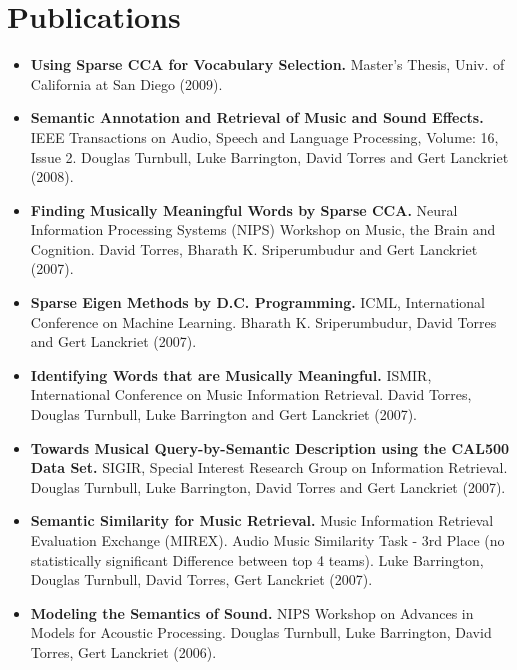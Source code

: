 \documentclass[letterpaper,11pt]{article}
\newcommand{\publicationItem}[2]{
    \item\small{
      \textbf{#1}{ #2 \vspace{-2pt}}
    }
  }
\newcommand{\resumeItemListStart}{\begin{itemize}}
\newcommand{\resumeItemListEnd}{\end{itemize}\vspace{-5pt}}
\begin{document}
\section{Publications}

    \resumeItemListStart
  
    \publicationItem{Using Sparse CCA for Vocabulary Selection.}
        {Master's Thesis, Univ. of California at San Diego (2009).}
    
    \publicationItem{Semantic Annotation and Retrieval of Music and Sound Effects.}
        {IEEE Transactions on Audio, Speech and Language Processing, Volume: 16, Issue 2.
    Douglas Turnbull, Luke Barrington, David Torres and Gert Lanckriet (2008).}

    \publicationItem{Finding Musically Meaningful Words by Sparse CCA.}
        {Neural Information Processing Systems (NIPS) Workshop on Music, the Brain and Cognition. David Torres, Bharath K.
    Sriperumbudur and Gert Lanckriet (2007).}

    \publicationItem{Sparse Eigen Methods by D.C. Programming.}
        {ICML, International Conference on Machine Learning. Bharath K. Sriperumbudur, David Torres and Gert Lanckriet (2007).}

    \publicationItem{Identifying Words that are Musically Meaningful.}
        {ISMIR, International Conference on Music Information Retrieval. David Torres, Douglas Turnbull, Luke Barrington and Gert
    Lanckriet (2007).}

    \publicationItem{Towards Musical Query-by-Semantic Description using the CAL500 Data Set.}
        {SIGIR, Special Interest Research Group on Information Retrieval. Douglas Turnbull, Luke
    Barrington, David Torres and Gert Lanckriet (2007).}

    \publicationItem{Semantic Similarity for Music Retrieval.}
        {Music Information Retrieval Evaluation Exchange (MIREX). Audio Music Similarity Task - 3rd Place (no statistically significant
    Difference between top 4 teams). Luke Barrington, Douglas Turnbull, David Torres, Gert Lanckriet
    (2007).}

    \publicationItem{Modeling the Semantics of Sound.}
        {NIPS Workshop on Advances in Models for Acoustic Processing. Douglas Turnbull, Luke Barrington, David Torres, Gert Lanckriet (2006).}
  
    \resumeItemListEnd

\end{document}
